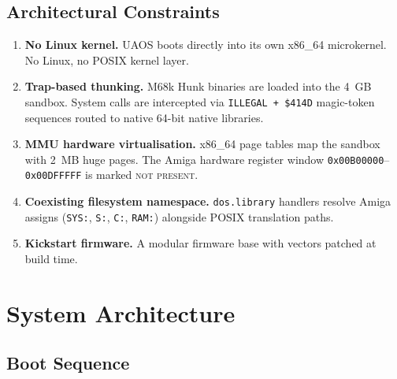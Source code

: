 \documentclass[11pt,a4paper]{report}
\begin{document}
\section{Architectural Constraints}

\begin{enumerate}
    \item \textbf{No Linux kernel.}  UAOS boots directly into its own
          x86\_64 microkernel.  No Linux, no POSIX kernel layer.

    \item \textbf{Trap-based thunking.}  M68k Hunk binaries are loaded into
          the 4~GB sandbox.  System calls are intercepted via
          \texttt{ILLEGAL + \$414D} magic-token sequences routed to native
          64-bit native libraries.

    \item \textbf{MMU hardware virtualisation.}  x86\_64 page tables map the
          sandbox with 2~MB huge pages.  The Amiga hardware register window
          \texttt{0x00B00000}--\texttt{0x00DFFFFF} is marked \textsc{not present}.

    \item \textbf{Coexisting filesystem namespace.}  \texttt{dos.library}
          handlers resolve Amiga assigns (\texttt{SYS:}, \texttt{S:},
          \texttt{C:}, \texttt{RAM:}) alongside POSIX translation paths.

    \item \textbf{Kickstart firmware.}  A modular firmware base with
          vectors patched at build time.
\end{enumerate}

\chapter{System Architecture}

\section{Boot Sequence}
\end{document}
